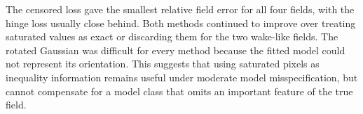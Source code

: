 The censored loss gave the smallest relative field error for all four fields,
with the hinge loss usually close behind.  Both methods continued to improve
over treating saturated values as exact or discarding them for the two
wake-like fields.  The rotated Gaussian was difficult for every method because
the fitted model could not represent its orientation.  This suggests that
using saturated pixels as inequality information remains useful under moderate
model misspecification, but cannot compensate for a model class that omits an
important feature of the true field.
